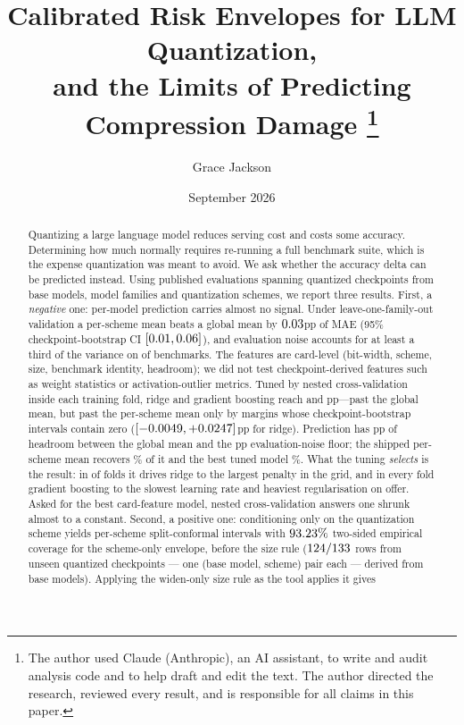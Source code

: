 \documentclass[11pt]{article}
\title{\textbf{Calibrated Risk Envelopes for LLM Quantization,\\
and the Limits of Predicting Compression Damage}%
\thanks{The author used Claude (Anthropic), an AI assistant, to write and audit analysis code and to help draft and edit the text. The author directed the research, reviewed every result, and is responsible for all claims in this paper.}}
\author{Grace Jackson}
\date{September 2026}
\begin{document}
\maketitle

\begin{abstract}
\noindent
Quantizing a large language model reduces serving cost and costs some accuracy.
Determining how much normally requires re-running a full benchmark suite, which
is the expense quantization was meant to avoid. We ask whether the accuracy
delta can be predicted instead. Using \Nrows{} published evaluations spanning
\NQuantCkpt{} quantized checkpoints from \NBase{} base models, \Nfam{} model
families and \Nsch{} quantization schemes, we report three results. First, a \emph{negative} one: per-model
prediction carries almost no signal. Under leave-one-family-out validation a
per-scheme mean beats a global mean by \(0.03\)pp of MAE (95\%
checkpoint-bootstrap CI \([0.01, 0.06]\)), and evaluation noise
accounts for at least a third of the variance on \NoiseNThird{} of
\NoiseNBench{} benchmarks. The features are card-level (bit-width, scheme,
size, benchmark identity, headroom); we did not test checkpoint-derived
features such as weight statistics or activation-outlier metrics. Tuned by
nested cross-validation inside each training fold, ridge and gradient boosting
reach \MaeRidgeTuned{} and \MaeGradboostTuned{}pp---past the global mean, but
past the per-scheme mean only by margins whose checkpoint-bootstrap intervals
contain zero (\([-0.0049, +0.0247]\)pp for ridge).
Prediction has \HeadroomPp{}pp of headroom between the global mean and the
\MaeFloor{}pp evaluation-noise floor; the shipped per-scheme mean recovers
\SchemeHeadroomPct{}\% of it and the best tuned model
\PredBestHeadroomPct{}\%. What the tuning \emph{selects} is the result: in
\TuneRidgeFoldsEdge{} of \TuneOuterFolds{} folds it drives ridge to the
largest penalty in the grid, and in every fold gradient boosting to the
slowest learning rate and heaviest regularisation on offer. Asked for the best
card-feature model, nested cross-validation answers one shrunk almost to a
constant.
Second, a positive one: conditioning only on the quantization scheme yields
per-scheme split-conformal intervals with \(93.23\%\) two-sided
empirical coverage for the scheme-only envelope, before the size rule
(\(124/133\) rows from \ProspClusN{} unseen quantized
checkpoints --- one (base model, scheme) pair each --- derived from
\ProspBases{} base models). Applying the widen-only size rule as the tool applies it gives

\end{abstract}
\end{document}
